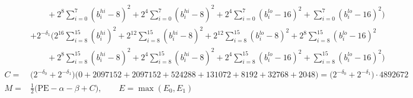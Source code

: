 \documentclass[fleqn]{article}
\begin{document}
{\[{\begin{aligned}
  & \qquad + 2^{8}\!\sum_{i=0}^{7}(b_i^{hi}{-}8)^2 + 2^{4}\!\sum_{i=0}^{7}(b_i^{hi}{-}8)^2 + 2^{4}\!\sum_{i=0}^{7}(b_i^{lo}{-}16)^2 + \sum_{i=0}^{7}(b_i^{lo}{-}16)^2\Big) \\
  & + 2^{-\delta_1}\Big(2^{16}\!\sum_{i=8}^{15}(b_i^{hi})^2 + 2^{12}\!\sum_{i=8}^{15}(b_i^{hi}{-}8)^2 + 2^{12}\!\sum_{i=8}^{15}(b_i^{lo}{-}8)^2 + 2^{8}\!\sum_{i=8}^{15}(b_i^{lo}{-}16)^2 \\
  & \qquad + 2^{8}\!\sum_{i=8}^{15}(b_i^{hi}{-}8)^2 + 2^{4}\!\sum_{i=8}^{15}(b_i^{hi}{-}8)^2 + 2^{4}\!\sum_{i=8}^{15}(b_i^{lo}{-}16)^2 + \sum_{i=8}^{15}(b_i^{lo}{-}16)^2\Big) \\[0.3em]
C ={}& \big(2^{-\delta_0} + 2^{-\delta_1}\big)\big(0 + 2097152 + 2097152 + 524288 + 131072 + 8192 + 32768 + 2048\big) = \big(2^{-\delta_0} + 2^{-\delta_1}\big)\cdot 4892672 \\[0.3em]
M ={}& \tfrac12\big(\mathrm{PE} - \alpha - \beta + C\big), \qquad E = \max(E_0,E_1)
\end{aligned}
\;}
\]
}
\end{document}
